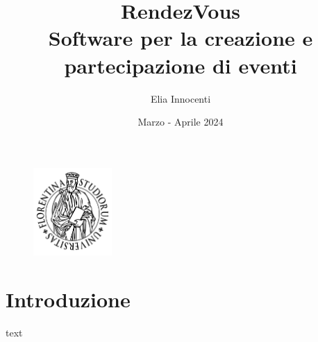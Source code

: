 \documentclass[11pt]{article}
\title{RendezVous \\
\vspace{0.5em}
\large Software per la creazione e partecipazione di eventi} %
\author{Elia Innocenti}
\date{Marzo - Aprile 2024}
\begin{document}

    \maketitle

    \vspace{1em}

    \begin{figure}[h]
        \begin{minipage}{\textwidth}
            \centering
            \includegraphics[width=3cm]{unifi-logo}
        \end{minipage}
        \label{fig:uni-logo}
    \end{figure}



    \newpage

    \tableofcontents


    \newpage

    \section{Introduzione} \label{sec:introduzione}

        text


\end{document}
